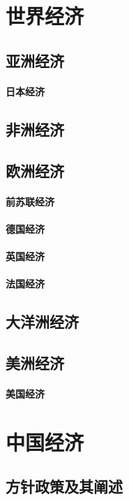 \documentclass[UTF8]{../../RepresentationUniverse}
\begin{document}
\chapter{世界经济}

\section{亚洲经济}
    \subsubsection{日本经济}
\section{非洲经济}
\section{欧洲经济}
    \subsubsection{前苏联经济}
    \subsubsection{德国经济}
    \subsubsection{英国经济}
    \subsubsection{法国经济}
\section{大洋洲经济}
\section{美洲经济}
    \subsubsection{美国经济}




    

\chapter{中国经济}
\section{方针政策及其阐述}
\end{document}
